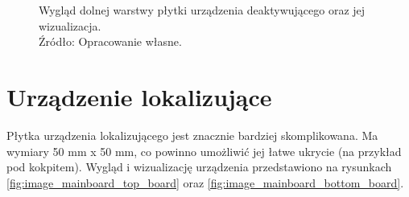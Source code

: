 \begin{figure}[H]
\centering
	\qquad
	
	\caption{Wygląd dolnej warstwy płytki urządzenia deaktywującego oraz jej wizualizacja. \\ Źródło: Opracowanie własne.}
	\label{fig:image_key_tag_bottom_board}
\end{figure}

\section{Urządzenie lokalizujące}

Płytka urządzenia lokalizującego jest znacznie bardziej skomplikowana. \linebreak Ma wymiary 50 mm x 50 mm, co powinno umożliwić jej łatwe ukrycie (na przykład pod kokpitem). Wygląd i wizualizację urządzenia przedstawiono na rysunkach \ref{fig:image_mainboard_top_board} oraz \ref{fig:image_mainboard_bottom_board}.

